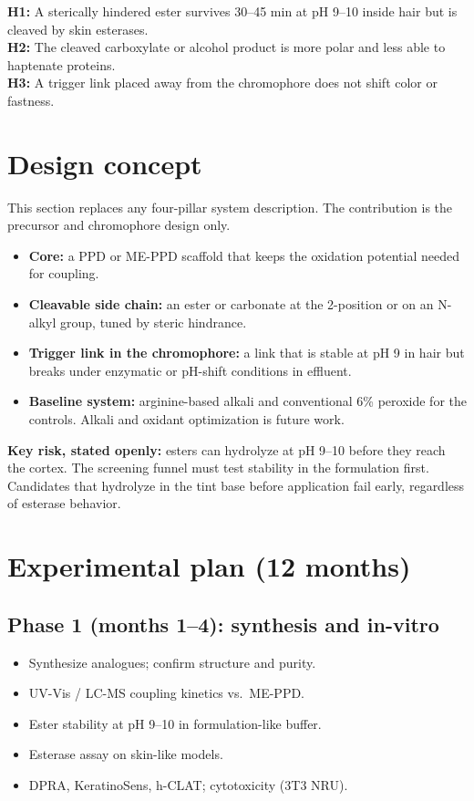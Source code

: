 \documentclass[11pt,a4paper]{article}
\begin{document}
\textbf{H1:} A sterically hindered ester survives 30--45 min at pH 9--10 inside hair but is cleaved by skin esterases.\\
\textbf{H2:} The cleaved carboxylate or alcohol product is more polar and less able to haptenate proteins.\\
\textbf{H3:} A trigger link placed away from the chromophore does not shift color or fastness.

\section{Design concept}

This section replaces any four-pillar system description. The contribution is the precursor and chromophore design only.

\begin{itemize}[leftmargin=1.5em]
\item \textbf{Core:} a PPD or ME-PPD scaffold that keeps the oxidation potential needed for coupling.
\item \textbf{Cleavable side chain:} an ester or carbonate at the 2-position or on an N-alkyl group, tuned by steric hindrance.
\item \textbf{Trigger link in the chromophore:} a link that is stable at pH 9 in hair but breaks under enzymatic or pH-shift conditions in effluent.
\item \textbf{Baseline system:} arginine-based alkali and conventional 6\% peroxide for the controls. Alkali and oxidant optimization is future work.
\end{itemize}

\textbf{Key risk, stated openly:} esters can hydrolyze at pH 9--10 before they reach the cortex. The screening funnel must test stability in the formulation first. Candidates that hydrolyze in the tint base before application fail early, regardless of esterase behavior.

\section{Experimental plan (12 months)}
\label{sec:plan}

\subsection{Phase 1 (months 1--4): synthesis and in-vitro}
\begin{itemize}[leftmargin=1.5em]
\item Synthesize analogues; confirm structure and purity.
\item UV-Vis / LC-MS coupling kinetics vs.\ ME-PPD.
\item Ester stability at pH 9--10 in formulation-like buffer.
\item Esterase assay on skin-like models.
\item DPRA, KeratinoSens, h-CLAT; cytotoxicity (3T3 NRU).
\end{itemize}
\end{document}
